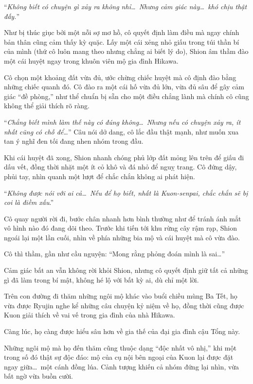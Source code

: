 \documentclass[../main.tex]{subfiles}
\begin{document}
``\textit{Không biết có chuyện gì xảy ra không nhỉ\dots\ Nhưng cảm giác này\dots\ khó chịu thật đấy.}''

Như bị thúc giục bởi một nỗi sợ mơ hồ, cô quyết định làm điều mà ngay chính bản thân cũng cảm thấy kỳ quặc. Lấy một cái xẻng nhỏ giấu trong túi thần bí của mình (thứ cô luôn mang theo nhưng chẳng ai biết lý do), Shion âm thầm đào một cái huyệt ngay trong khuôn viên mộ gia đình Hikawa.

Cô chọn một khoảng đất vừa đủ, ước chừng chiếc huyệt mà cô định đào bằng những chiếc quanh đó. Cô đào ra một cái hố vừa đủ lớn, vừa đủ sâu để gây cảm giác ``đề phòng,'' như thể chuẩn bị sẵn cho một điều chẳng lành mà chính cô cũng không thể giải thích rõ ràng.

``\textit{Chẳng biết mình làm thế này có đúng không\dots\ Nhưng nếu có chuyện xảy ra, ít nhất cũng có chỗ để\dots}'' Câu nói dở dang, cô lắc đầu thật mạnh, như muốn xua tan ý nghĩ đen tối đang nhen nhóm trong đầu.

Khi cái huyệt đã xong, Shion nhanh chóng phủ lớp đất mỏng lên trên để giấu đi dấu vết, đồng thời nhặt một ít cỏ khô và đá nhỏ để nguỵ trang. Cô đứng dậy, phủi tay, nhìn quanh một lượt để chắc chắn không ai phát hiện.

``\textit{Không được nói với ai cả\dots\ Nếu để họ biết, nhất là Kuon-senpai, chắc chắn sẽ bị coi là điềm xấu}.''

Cô quay người rời đi, bước chân nhanh hơn bình thường như để tránh ánh mắt vô hình nào đó đang dõi theo. Trước khi tiến tới khu rừng cây rậm rạp, Shion ngoái lại một lần cuối, nhìn về phía những bia mộ và cái huyệt mà cô vừa đào.

Cô thì thầm, gần như cầu nguyện: ``Mong rằng phỏng đoán mình là sai\dots''

Cảm giác bất an vẫn không rời khỏi Shion, nhưng cô quyết định giữ tất cả những gì đã làm trong bí mật, không hé lộ với bất kỳ ai, dù chỉ một lời.

\ct

Trên con đường đi thăm những ngôi mộ khác vào buổi chiều mùng Ba Tết, họ vừa được Ryujin nghe kể những câu chuyện kỷ niệm về họ, đồng thời cũng được Kuon giải thích về vai vế trong gia đình của nhà Hikawa.

Càng lúc, họ càng được hiểu sâu hơn về gia thế của đại gia đình cậu Tổng này.

Những ngôi mộ mà họ đến thăm cũng thuộc dạng ``độc nhất vô nhị,'' khi một trong số đó thật sự độc đáo: mộ của cụ nội bên ngoại của Kuon lại được đặt ngay giữa\dots\ một cánh đồng lúa. Cảnh tượng khiến cả nhóm đứng lại nhìn, vừa bất ngờ vừa buồn cười.
\end{document}
